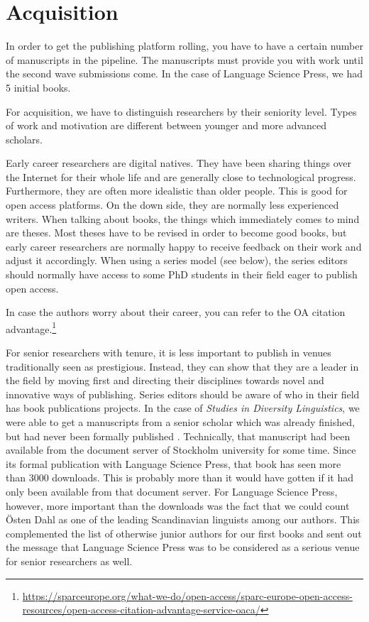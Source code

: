 \documentclass[guidelines,nonflat,modfonts] {langsci/langscibook}
\begin{document}
\section{Acquisition}\label{sec:acquisition}
In order to get the publishing platform rolling, you have to have a certain number of manuscripts in the pipeline. The manuscripts must provide you with work until the second wave submissions come. In the case of Language Science Press, we had 5 %
 initial books. 

For acquisition, we have to distinguish researchers by their seniority level. Types of work and motivation are different between younger and more advanced scholars.

Early career researchers are digital natives. They have been sharing things over the Internet for their whole life and are generally close to technological progress. Furthermore, they are often more idealistic than older people. This is good for open access platforms. On the down side, they are normally less experienced writers. When talking about books, the things which immediately comes to mind are theses. Most theses have to be revised in order to become good books, but early career researchers are normally happy to receive feedback on their work and adjust it accordingly. When using a series model (see below), the series editors should normally have access to some PhD students in their field eager to publish open access. 

In case the authors worry about their career, you can refer to the OA citation advantage.\footnote{\url{https://sparceurope.org/what-we-do/open-access/sparc-europe-open-access-resources/open-access-citation-advantage-service-oaca/}}

For senior researchers with tenure, it is less important to publish in venues traditionally seen as prestigious. Instead, they can show that they are a leader in the field by moving first and directing their disciplines towards novel and innovative ways of publishing. 
Series editors should be aware of who in their field has book publications projects. In the case of \textit{Studies in Diversity Linguistics}, we were able to get a manuscripts from a senior scholar which was already finished, but had never been formally published \citep{Dahl2016}. Technically, that manuscript had been available from the document server of Stockholm university for some time. Since its formal publication with Language Science Press, that book has seen more than 3000 downloads. This is probably more than it would have gotten if it had only been available from that document server. For Language Science Press, however, more important than the downloads  was the fact that we could count Östen Dahl as one of the leading Scandinavian linguists among our authors. This complemented the list of otherwise junior authors for our first books and sent out the message that Language Science Press was to be considered as a serious venue for senior researchers as well. 
\end{document}
